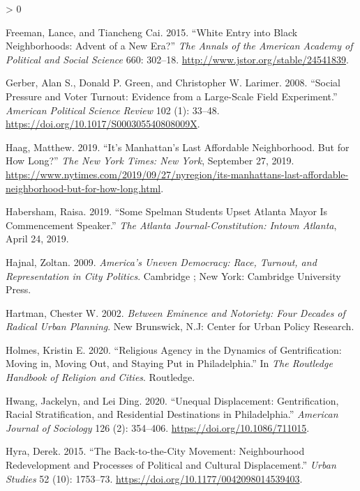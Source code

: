 \documentclass[
  12pt,
]{article}
\newlength{\cslhangindent}
\newenvironment{CSLReferences}[2] %
 {%
  \setlength{\parindent}{0pt}
  \ifodd #1 \everypar{\setlength{\hangindent}{\cslhangindent}}\ignorespaces\fi
  \ifnum #2 > 0
  \setlength{\parskip}{#2\baselineskip}
  \fi
 }%
 {}
\begin{document}
\begin{CSLReferences}{1}{0}
\leavevmode\hypertarget{ref-Freeman2015}{}%
Freeman, Lance, and Tiancheng Cai. 2015. {``White {Entry} into {Black Neighborhoods}: {Advent} of a {New Era}?''} \emph{The Annals of the American Academy of Political and Social Science} 660: 302--18. \url{http://www.jstor.org/stable/24541839}.

\leavevmode\hypertarget{ref-Gerber2008}{}%
Gerber, Alan S., Donald P. Green, and Christopher W. Larimer. 2008. {``Social {Pressure} and {Voter Turnout}: {Evidence} from a {Large-Scale Field Experiment}.''} \emph{American Political Science Review} 102 (1): 33--48. \url{https://doi.org/10.1017/S000305540808009X}.

\leavevmode\hypertarget{ref-Haag2019}{}%
Haag, Matthew. 2019. {``It's {Manhattan}'s {Last Affordable Neighborhood}. {But} for {How Long}?''} \emph{The New York Times: New York}, September 27, 2019. \url{https://www.nytimes.com/2019/09/27/nyregion/its-manhattans-last-affordable-neighborhood-but-for-how-long.html}.

\leavevmode\hypertarget{ref-Habersham2019}{}%
Habersham, Raisa. 2019. {``Some {Spelman} Students Upset {Atlanta} Mayor Is Commencement Speaker.''} \emph{The Atlanta Journal-Constitution: Intown Atlanta}, April 24, 2019.

\leavevmode\hypertarget{ref-Hajnal2009}{}%
Hajnal, Zoltan. 2009. \emph{America's Uneven Democracy: Race, Turnout, and Representation in City Politics}. {Cambridge ; New York}: {Cambridge University Press}.

\leavevmode\hypertarget{ref-Hartman2002}{}%
Hartman, Chester W. 2002. \emph{Between Eminence and Notoriety: Four Decades of Radical Urban Planning}. {New Brunswick, N.J}: {Center for Urban Policy Research}.

\leavevmode\hypertarget{ref-Holmes2020}{}%
Holmes, Kristin E. 2020. {``Religious Agency in the Dynamics of Gentrification: {Moving} in, Moving Out, and Staying Put in {Philadelphia}.''} In \emph{The {Routledge Handbook} of {Religion} and {Cities}}. {Routledge}.

\leavevmode\hypertarget{ref-Hwang2020}{}%
Hwang, Jackelyn, and Lei Ding. 2020. {``Unequal {Displacement}: {Gentrification}, {Racial Stratification}, and {Residential Destinations} in {Philadelphia}.''} \emph{American Journal of Sociology} 126 (2): 354--406. \url{https://doi.org/10.1086/711015}.

\leavevmode\hypertarget{ref-Hyra2015}{}%
Hyra, Derek. 2015. {``The Back-to-the-City Movement: {Neighbourhood} Redevelopment and Processes of Political and Cultural Displacement.''} \emph{Urban Studies} 52 (10): 1753--73. \url{https://doi.org/10.1177/0042098014539403}.


\end{CSLReferences}
\end{document}
